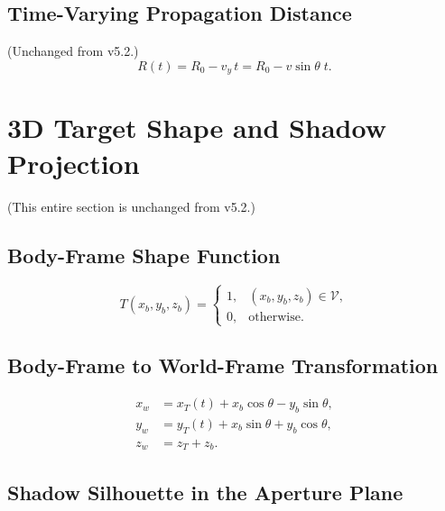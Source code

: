 \documentclass[11pt,a4paper]{article}
\begin{document}
\subsection{Time-Varying Propagation Distance}
\label{sec:R_of_t}

(Unchanged from v5.2.)
\begin{equation}
  R(t) = R_0 - v_y\,t = R_0 - v\sin\theta\;\!t.
  \label{eq:R_of_t}
\end{equation}

\section{3D Target Shape and Shadow Projection}
\label{sec:3d_shadow}

(This entire section is unchanged from v5.2.)

\subsection{Body-Frame Shape Function}

\begin{equation}
  T(x_b,y_b,z_b) =
  \begin{cases}
    1, & (x_b,y_b,z_b)\in\mathcal{V},\\
    0, & \text{otherwise}.
  \end{cases}
  \label{eq:body_shape}
\end{equation}

\subsection{Body-Frame to World-Frame Transformation}

\begin{align}
  x_w &= x_T(t) + x_b\cos\theta - y_b\sin\theta,
  \label{eq:xw}\\
  y_w &= y_T(t) + x_b\sin\theta + y_b\cos\theta,
  \label{eq:yw}\\
  z_w &= z_T + z_b.
  \label{eq:zw}
\end{align}

\subsection{Shadow Silhouette in the Aperture Plane}
\label{sec:shadow_silhouette}
\end{document}
